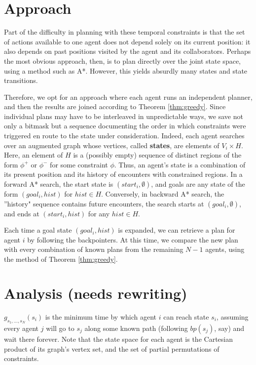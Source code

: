 \documentclass[letterpaper]{article}
\begin{document}
\section{Approach}

Part of the difficulty in planning with these temporal constraints is that the set of actions available to one agent does not depend solely on its current position: it also depends on past positions visited by the agent and its collaborators. Perhaps the most obvious approach, then, is to plan directly over the joint state space, using a method such as A*. However, this yields absurdly many states and state transitions.

Therefore, we opt for an approach where each agent runs an independent planner, and then the results are joined according to Theorem \ref{thm:greedy}. Since individual plans may have to be interleaved in unpredictable ways, we save not only a bitmask but a sequence documenting the order in which constraints were triggered en route to the state under consideration. Indeed, each agent searches over an augmented graph whose vertices, called \textbf{states}, are elements of $V_i \times H$. Here, an element of $H$ is a (possibly empty) sequence of distinct regions of the form $\phi^+$ or $\phi^-$ for some constraint $\phi$. Thus, an agent's state is a combination of its present position and its history of encounters with constrained regions. In a forward A* search, the start state is $(start_i, \emptyset)$, and goals are any state of the form $(goal_i, hist)$ for $hist\in H$. Conversely, in backward A* search, the ''history" sequence contains future encounters, the search starts at $(goal_i, \emptyset)$, and ends at $(start_i, hist)$ for any $hist\in H$.

Each time a goal state $(goal_i, hist)$ is expanded, we can retrieve a plan for agent $i$ by following the backpointers. At this time, we compare the new plan with every combination of known plans from the remaining $N-1$ agents, using the method of Theorem \ref{thm:greedy}.

\section{Analysis (needs rewriting)}

$g_{s_1,\ldots,s_N}(s_i)$ is the minimum time by which agent $i$ can reach state $s_i$, assuming every agent $j$ will go to $s_j$ along some known path (following $bp(s_j)$, say) and wait there forever. Note that the state space for each agent is the Cartesian product of its graph's vertex set, and the set of partial permutations of constraints.
\end{document}
